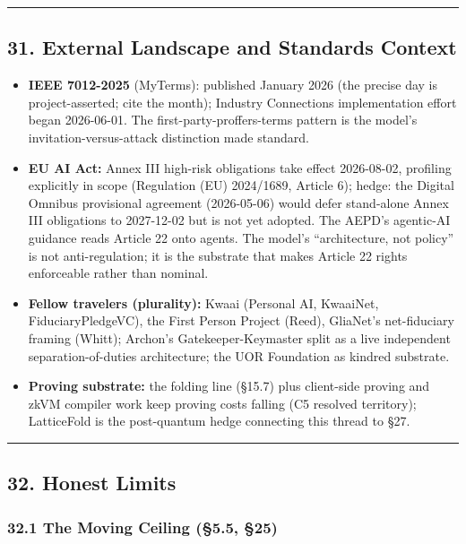 \documentclass[
  11pt,
]{article}
\providecommand{\tightlist}{%
  \setlength{\itemsep}{0pt}\setlength{\parskip}{0pt}}
\begin{document}
\begin{center}\rule{0.5\linewidth}{0.5pt}\end{center}

\subsection{31. External Landscape and Standards
Context}\label{external-landscape-and-standards-context}

\begin{itemize}
\tightlist
\item
  \textbf{IEEE 7012-2025} (MyTerms): published January 2026 (the precise
  day is project-asserted; cite the month); Industry Connections
  implementation effort began 2026-06-01. The first-party-proffers-terms
  pattern is the model's invitation-versus-attack distinction made
  standard.
\item
  \textbf{EU AI Act:} Annex III high-risk obligations take effect
  2026-08-02, profiling explicitly in scope (Regulation (EU) 2024/1689,
  Article 6); hedge: the Digital Omnibus provisional agreement
  (2026-05-06) would defer stand-alone Annex III obligations to
  2027-12-02 but is not yet adopted. The AEPD's agentic-AI guidance
  reads Article 22 onto agents. The model's ``architecture, not policy''
  is not anti-regulation; it is the substrate that makes Article 22
  rights enforceable rather than nominal.
\item
  \textbf{Fellow travelers (plurality):} Kwaai (Personal AI, KwaaiNet,
  FiduciaryPledgeVC), the First Person Project (Reed), GliaNet's
  net-fiduciary framing (Whitt); Archon's Gatekeeper-Keymaster split as
  a live independent separation-of-duties architecture; the UOR
  Foundation as kindred substrate.
\item
  \textbf{Proving substrate:} the folding line (§15.7) plus client-side
  proving and zkVM compiler work keep proving costs falling (C5 resolved
  territory); LatticeFold is the post-quantum hedge connecting this
  thread to §27.
\end{itemize}

\begin{center}\rule{0.5\linewidth}{0.5pt}\end{center}

\subsection{32. Honest Limits}\label{honest-limits}

\subsubsection{32.1 The Moving Ceiling (§5.5,
§25)}\label{the-moving-ceiling-5.5-25}
\end{document}
